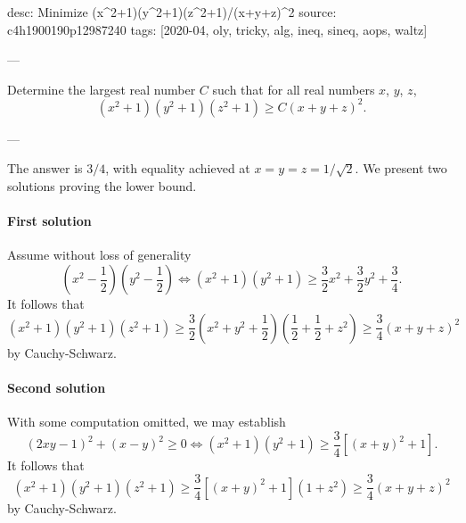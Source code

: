 desc: Minimize (x^2+1)(y^2+1)(z^2+1)/(x+y+z)^2
source: c4h1900190p12987240
tags: [2020-04, oly, tricky, alg, ineq, sineq, aops, waltz]

---

Determine the largest real number $C$ such that for all real numbers $x$, $y$, $z$, \[\left(x^2+1\right)\left(y^2+1\right)\left(z^2+1\right)\ge C(x+y+z)^2.\]

---

The answer is $3/4$, with equality achieved at $x=y=z=1/\sqrt2$. We present two solutions proving the lower bound.

\paragraph{First solution} Assume without loss of generality \[\left(x^2-\frac12\right)\left(y^2-\frac12\right)\iff\left(x^2+1\right)\left(y^2+1\right)\ge\frac32x^2+\frac32y^2+\frac34.\]
It follows that \[\left(x^2+1\right)\left(y^2+1\right)\left(z^2+1\right)\ge\frac32\left(x^2+y^2+\frac12\right)\left(\frac12+\frac12+z^2\right)\ge\frac34(x+y+z)^2\]
by Cauchy-Schwarz.

\paragraph{Second solution} With some computation omitted, we may establish \[(2xy-1)^2+(x-y)^2\ge0\iff \left(x^2+1\right)\left(y^2+1\right)\ge\frac34\left[(x+y)^2+1\right].\]
It follows that \[\left(x^2+1\right)\left(y^2+1\right)\left(z^2+1\right)\ge\frac34\left[(x+y)^2+1\right]\left(1+z^2\right)\ge\frac34(x+y+z)^2\]
by Cauchy-Schwarz.


